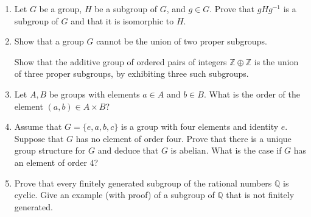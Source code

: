 \documentclass[12pt]{article}
\newcommand{\QQ}{{\mathbb Q}}
\newcommand{\ZZ}{{\mathbb Z}}
\begin{document}
\begin{enumerate}

\item  Let $G$ be a group, $H$ be a subgroup of $G$, and $g\in G$.
       Prove that $gHg^{-1}$ is a subgroup of $G$ and that it is isomorphic to $H$.

 
\item      Show that a group $G$ cannot be the union of two proper subgroups.

  
  Show that the additive group of ordered pairs of integers $\ZZ\oplus\ZZ$ is the union of three proper subgroups,
  by exhibiting three such subgroups.
 


 
\item Let $A,B$ be groups with elements $a\in A$ and $b\in B$.
      What is the order of the element $(a,b)\in A\times B$?


\item Assume that $G=\{e,a,b,c\}$ is a group with four elements and identity $e$.
      Suppose that $G$ has no element of order four.
      Prove that there is a unique group structure for $G$ and deduce that $G$ is  abelian.
      What is the case if $G$ has an element of order $4$?


\item 
    Prove that every finitely generated subgroup of the rational numbers $\QQ$ is cyclic.
      Give an example (with proof) of a subgroup of $\QQ$ that is not finitely generated.






\end{enumerate}
\end{document}
